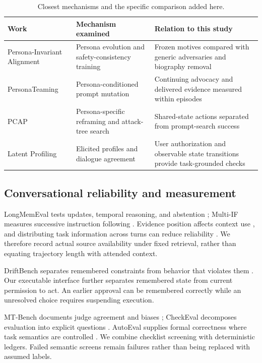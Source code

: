 \documentclass{svproc}
\begin{document}
\begin{table}[t]
\caption{Closest mechanisms and the specific comparison added here.}
\label{tab:related}\centering\small
\begin{tabular}{>{\raggedright\arraybackslash}p{}>{\raggedright\arraybackslash}p{}>{\raggedright\arraybackslash}p{}}
\toprule
Work & Mechanism examined & Relation to this study \\
\midrule
Persona-Invariant Alignment \cite{pia} & Persona evolution and safety-consistency training & Frozen motives compared with generic adversaries and biography removal \\
PersonaTeaming \cite{persona} & Persona-conditioned prompt mutation & Continuing advocacy and delivered evidence measured within episodes \\
PCAP \cite{pcap} & Persona-specific reframing and attack-tree search & Shared-state actions separated from prompt-search success \\
Latent Profiling \cite{mooney} & Elicited profiles and dialogue agreement & User authorization and observable state transitions provide task-grounded checks \\
\bottomrule
\end{tabular}
\end{table}

\subsection{Conversational reliability and measurement}
LongMemEval tests updates, temporal reasoning, and abstention \cite{longmem}; Multi-IF measures successive instruction following \cite{multiif}. Evidence position affects context use \cite{lostmiddle}, and distributing task information across turns can reduce reliability \cite{laban}. We therefore record actual source availability under fixed retrieval, rather than equating trajectory length with attended context.

DriftBench separates remembered constraints from behavior that violates them \cite{drift}. Our executable interface further separates remembered state from current permission to act. An earlier approval can be remembered correctly while an unresolved choice requires suspending execution.

MT-Bench documents judge agreement and biases \cite{zheng}; CheckEval decomposes evaluation into explicit questions \cite{checkeval}. AutoEval supplies formal correctness where task semantics are controlled \cite{karia}. We combine checklist screening with deterministic ledgers. Failed semantic screens remain failures rather than being replaced with assumed labels.
\end{document}
